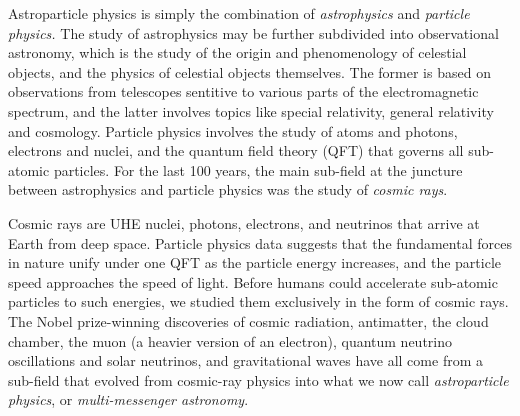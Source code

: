 \documentclass[../../main.tex]{subfiles}
\begin{document}
Astroparticle physics is simply the combination of \textit{astrophysics} and \textit{particle physics.}  The study of astrophysics may be further subdivided into observational astronomy, which is the study of the origin and phenomenology of celestial objects, and the physics of celestial objects themselves.  The former is based on observations from telescopes sentitive to various parts of the electromagnetic spectrum, and the latter involves topics like special relativity, general relativity and cosmology.  Particle physics involves the study of atoms and photons, electrons and nuclei, and the quantum field theory (QFT) that governs all sub-atomic particles.  For the last 100 years, the main sub-field at the juncture between astrophysics and particle physics was the study of \textit{cosmic rays}. \\ \hspace{0.1cm}

Cosmic rays are UHE nuclei, photons, electrons, and neutrinos that arrive at Earth from deep space.  Particle physics data suggests that the fundamental forces in nature unify under one QFT as the particle energy increases, and the particle speed approaches the speed of light.  Before humans could accelerate sub-atomic particles to such energies, we studied them exclusively in the form of cosmic rays.  The Nobel prize-winning discoveries of cosmic radiation, antimatter, the cloud chamber, the muon (a heavier version of an electron), quantum neutrino oscillations and solar neutrinos, and gravitational waves have all come from a sub-field that evolved from cosmic-ray physics into what we now call \textit{astroparticle physics}, or \textit{multi-messenger astronomy}. \\ \hspace{0.1cm}
\end{document}
